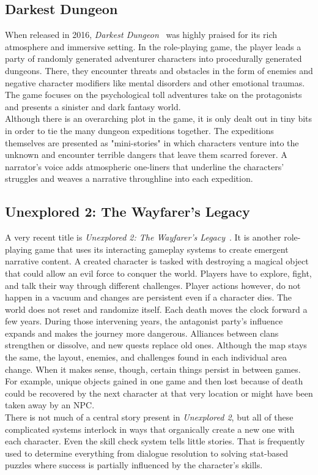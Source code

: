\subsection{Darkest Dungeon}
When released in 2016, \textit{Darkest Dungeon}~\cite{dungeon} was highly praised for its rich atmosphere and immersive setting. In the role-playing game, the player leads a party of randomly generated adventurer characters into procedurally generated dungeons. There, they encounter threats and obstacles in the form of enemies and negative character modifiers like mental disorders and other emotional traumas. The game focuses on the psychological toll adventures take on the protagonists and presents a sinister and dark fantasy world.\\
Although there is an overarching plot in the game, it is only dealt out in tiny bits in order to tie the many dungeon expeditions together. The expeditions themselves are presented as "mini-stories" in which characters venture into the unknown and encounter terrible dangers that leave them scarred forever. A narrator's voice adds atmospheric one-liners that underline the characters' struggles and weaves a narrative throughline into each expedition.
\subsection{Unexplored 2: The Wayfarer's Legacy}
A very recent title is \textit{Unexplored 2: The Wayfarer's Legacy}~\cite{unexplored}. It is another role-playing game that uses its interacting gameplay systems to create emergent narrative content. A created character is tasked with destroying a magical object that could allow an evil force to conquer the world. Players have to explore, fight, and talk their way through different challenges. Player actions however, do not happen in a vacuum and changes are persistent even if a character dies. The world does not reset and randomize itself. Each death moves the clock forward a few years. During those intervening years, the antagonist party's influence expands and makes the journey more dangerous. Alliances between clans strengthen or dissolve, and new quests replace old ones. Although the map stays the same, the layout, enemies, and challenges found in each individual area change. When it makes sense, though, certain things persist in between games. For example, unique objects gained in one game and then lost because of death could be recovered by the next character at that very location or might have been taken away by an NPC.\\
There is not much of a central story present in \textit{Unexplored 2}, but all of these complicated systems interlock in ways that organically create a new one with each character. Even the skill check system tells little stories. That is frequently used to determine everything from dialogue resolution to solving stat-based puzzles where success is partially influenced by the character's skills.
